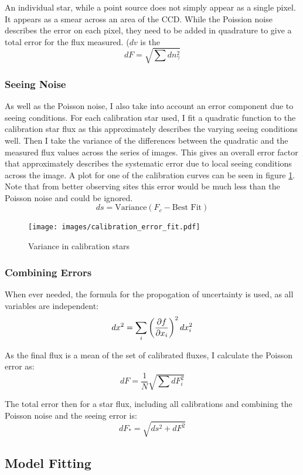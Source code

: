 An individual star, while a point source does not simply appear as a single pixel. It appears as a smear across an area of the CCD. While the Poission noise describes the error on each pixel, they need to be added in quadrature to give a total error for the flux measured. ($dv$ is the
\[ dF = \sqrt{\sum{dn_\gamma^2}} \]

\subsubsection{Seeing Noise}

As well as the Poisson noise, I also take into account an error component due to seeing conditions. For each calibration star used, I fit a quadratic function to the calibration star flux as this approximately describes the varying seeing conditions well. Then I take the variance of the differences between the quadratic and the measured flux values across the series of images. This gives an overall error factor that approximately describes the systematic error due to local seeing conditions across the image. A plot for one of the calibration curves can be seen in figure \ref{fig:calibration_error}. Note that from better observing sites this error would be much less than the Poisson noise and could be ignored.
\[ ds = \text{Variance}(F_c - \text{Best Fit})\]

\begin{figure}[ht]
    \centering
    \texttt{[image: images/calibration\_error\_fit.pdf]}
    \caption{Variance in calibration stars}
    \label{fig:calibration_error}
\end{figure}

\subsubsection{Combining Errors}

When ever needed, the formula for the propogation of uncertainty is used, as all variables are independent:
\[ dx^2 = \sum_i \left( \frac{\partial f}{\partial x_i}\right)^2 dx_i^2  \]

As the final flux is a mean of the set of calibrated fluxes, I calculate the Poisson error as:
\[ dF = \frac{1}{N}\sqrt{\sum{dF_i^2}} \]

The total error then for a star flux, including all calibrations and combining the Poisson noise and the seeing error is:
\[  dF_* = \sqrt{ds^2 + dF^2} \]

\subsection{Model Fitting}
